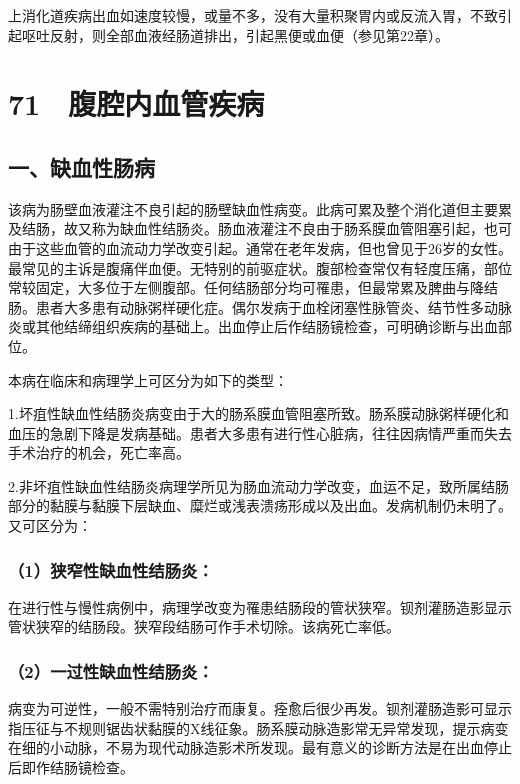上消化道疾病出血如速度较慢，或量不多，没有大量积聚胃内或反流入胃，不致引起呕吐反射，则全部血液经肠道排出，引起黑便或血便（参见第22章）。

\protect\hypertarget{text00179.html}{}{}

\section{71　腹腔内血管疾病}

\subsection{一、缺血性肠病}

该病为肠壁血液灌注不良引起的肠壁缺血性病变。此病可累及整个消化道但主要累及结肠，故又称为缺血性结肠炎。肠血液灌注不良由于肠系膜血管阻塞引起，也可由于这些血管的血流动力学改变引起。通常在老年发病，但也曾见于26岁的女性。最常见的主诉是腹痛伴血便。无特别的前驱症状。腹部检查常仅有轻度压痛，部位常较固定，大多位于左侧腹部。任何结肠部分均可罹患，但最常累及脾曲与降结肠。患者大多患有动脉粥样硬化症。偶尔发病于血栓闭塞性脉管炎、结节性多动脉炎或其他结缔组织疾病的基础上。出血停止后作结肠镜检查，可明确诊断与出血部位。

本病在临床和病理学上可区分为如下的类型：

1.坏疽性缺血性结肠炎病变由于大的肠系膜血管阻塞所致。肠系膜动脉粥样硬化和血压的急剧下降是发病基础。患者大多患有进行性心脏病，往往因病情严重而失去手术治疗的机会，死亡率高。

2.非坏疽性缺血性结肠炎病理学所见为肠血流动力学改变，血运不足，致所属结肠部分的黏膜与黏膜下层缺血、糜烂或浅表溃疡形成以及出血。发病机制仍未明了。又可区分为：

\subsubsection{（1）狭窄性缺血性结肠炎：}

在进行性与慢性病例中，病理学改变为罹患结肠段的管状狭窄。钡剂灌肠造影显示管状狭窄的结肠段。狭窄段结肠可作手术切除。该病死亡率低。

\subsubsection{（2）一过性缺血性结肠炎：}

病变为可逆性，一般不需特别治疗而康复。痊愈后很少再发。钡剂灌肠造影可显示指压征与不规则锯齿状黏膜的X线征象。肠系膜动脉造影常无异常发现，提示病变在细的小动脉，不易为现代动脉造影术所发现。最有意义的诊断方法是在出血停止后即作结肠镜检查。

